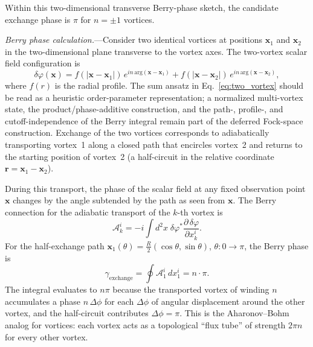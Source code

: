 \documentclass[aps,prd,onecolumn,superscriptaddress,nofootinbib,showpacs,12pt,notitlepage]{revtex4-2}
\begin{document}
Within this two-dimensional transverse Berry-phase sketch,
the candidate exchange phase is $\pi$ for $n = \pm 1$
vortices.

\textit{Berry phase calculation.}---Consider two
identical vortices at positions $\mathbf{x}_{1}$ and
$\mathbf{x}_{2}$ in the two-dimensional plane transverse
to the vortex axes.  The two-vortex scalar field
configuration is
\begin{equation}\label{eq:two_vortex}
  \delta\varphi(\mathbf{x})
  = f(|\mathbf{x} - \mathbf{x}_{1}|)\,
    e^{in\,\mathrm{arg}(\mathbf{x}-\mathbf{x}_{1})}
  + f(|\mathbf{x} - \mathbf{x}_{2}|)\,
    e^{in\,\mathrm{arg}(\mathbf{x}-\mathbf{x}_{2})},
\end{equation}
where $f(r)$ is the radial profile.  The sum ansatz in
Eq.~\eqref{eq:two_vortex} should be read as a heuristic
order-parameter representation; a normalized multi-vortex
state, the product/phase-additive construction, and the
path-, profile-, and cutoff-independence of the Berry
integral remain part of the deferred Fock-space
construction.  Exchange of the two
vortices corresponds to adiabatically transporting
vortex~1 along a closed path that encircles vortex~2
and returns to the starting position of vortex~2
(a half-circuit in the relative coordinate
$\mathbf{r} = \mathbf{x}_{1} - \mathbf{x}_{2}$).

During this transport, the phase of the scalar field at
any fixed observation point $\mathbf{x}$ changes by the
angle subtended by the path as seen from $\mathbf{x}$.
The Berry connection for the adiabatic transport of the
$k$-th vortex is
\begin{equation}\label{eq:berry_connection}
  \mathcal{A}_{k}^{i}
  = -i\!\int\! d^{2}x\;\delta\varphi^{*}
    \frac{\partial\,\delta\varphi}
         {\partial x_{k}^{i}}.
\end{equation}
For the half-exchange path
$\mathbf{x}_{1}(\theta) = \frac{R}{2}(\cos\theta,
\sin\theta)$, $\theta: 0 \to \pi$, the Berry phase is
\begin{equation}\label{eq:berry_integral}
  \gamma_{\mathrm{exchange}}
  = \oint \mathcal{A}_{1}^{i}\,dx_{1}^{i}
  = n \cdot \pi.
\end{equation}
The integral evaluates to $n\pi$ because the transported
vortex of winding $n$ accumulates a phase $n\,\Delta\phi$
for each $\Delta\phi$ of angular displacement around
the other vortex, and the half-circuit contributes
$\Delta\phi = \pi$.  This is the Aharonov--Bohm
analog for vortices: each vortex acts as a
topological ``flux tube'' of strength $2\pi n$ for
every other vortex.
\end{document}
